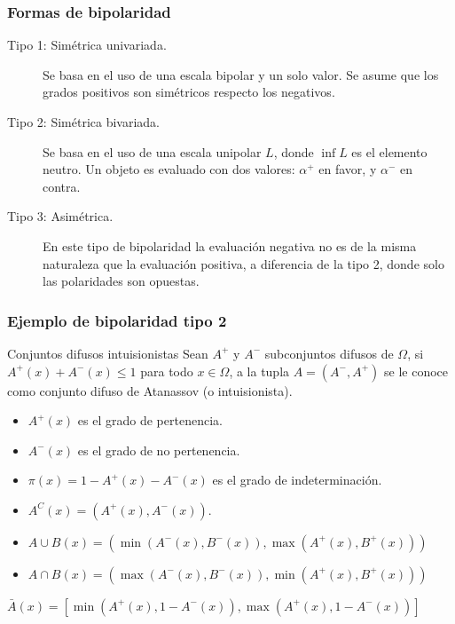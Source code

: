 \documentclass{beamer}
\theoremstyle{definition}
\begin{document}
\begin{frame}
  \frametitle{Formas de bipolaridad}
  \begin{description}
  \item[Tipo 1: Simétrica univariada.] Se basa en el uso de una escala bipolar
    y un solo valor. Se asume que los grados positivos son simétricos
    respecto los negativos.
  \item[Tipo 2: Simétrica bivariada.] Se basa en el uso de una escala
    unipolar $L$, donde $\inf L$ es el elemento neutro. Un objeto es
    evaluado con dos valores: $\alpha^+$ en favor, y $\alpha^-$ en
    contra. 
  \item[Tipo 3: Asimétrica.] En este tipo de bipolaridad la evaluación
    negativa no es de la misma naturaleza que la evaluación positiva,
    a diferencia de la tipo 2, donde solo las polaridades son opuestas. 
  \end{description}
\end{frame}
 
\begin{frame}
  \frametitle{Ejemplo de bipolaridad tipo 2}
  \begin{block}{Conjuntos difusos intuisionistas}
    Sean $A^+$ y $A^-$ subconjuntos difusos de $\Omega$, si $A^+(x) +
    A^-(x) \leq 1$ para todo $x \in \Omega$, a la tupla $A = (A^-, A^+)$
    se le conoce como conjunto difuso de Atanassov (o intuisionista). 
  \end{block}

  \begin{itemize}
  \item $A^+(x)$ es el grado de pertenencia. 
  \item $A^-(x)$ es el grado de no pertenencia.
  \item $\pi(x) = 1 - A^+(x) - A^-(x)$ es el grado de indeterminación.
  \item $A^C(x) = (A^+(x), A^-(x))$.
  \item $A \cup B (x) = (\min(A^-(x), B^-(x)), \max(A^+(x), B^+(x)))$
  \item $A \cap B (x) = (\max(A^-(x), B^-(x)), \min(A^+(x), B^+(x)))$
  \end{itemize}

  \begin{center}
    \alert{$\bar{A}(x) =
      [\min(A^+(x), 1 - A^-(x)), \max(A^+(x), 1 - A^-(x))]$}
  \end{center}

\end{frame}
\end{document}
